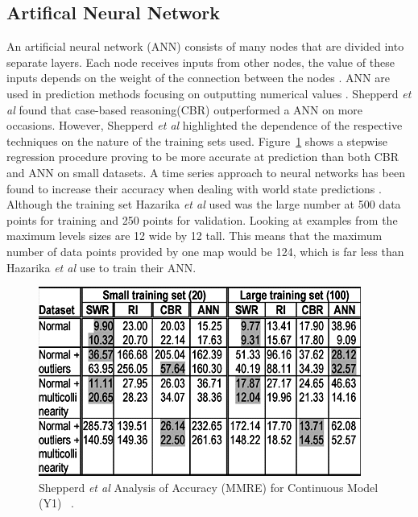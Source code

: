 \documentclass[journal]{IEEEtran}
\begin{document}
\subsection{Artifical Neural Network}
An artificial neural network (ANN) consists of many nodes that are divided into separate layers. Each node receives inputs from other nodes, the value of these inputs depends on the weight of the connection between the nodes \cite{lai2010prediction}. ANN are used in prediction methods focusing on outputting numerical values \cite{lai2010prediction, akdag2009estimation}. Shepperd \textit{et al} \cite{shepperd2001comparing} found that case-based reasoning(CBR) outperformed a ANN on more occasions. However, Shepperd \textit{et al}\cite{shepperd2001comparing} highlighted the dependence of the respective techniques on the nature of the training sets used. Figure~\ref{learningSets} shows a stepwise regression procedure proving to be more accurate at prediction than both CBR and ANN on small datasets.  A time series approach to neural networks has been found to increase their accuracy when dealing with world state predictions \cite{hazarika1998neural}. Although the training set Hazarika \textit{et al} used was the large number at 500 data points for training and 250 points for validation. Looking at examples from \cite{liapis2013sentient, alvarez2018fostering,  baldwin2017mixed} the maximum levels sizes are 12 wide by 12 tall. This means that the maximum number of data points provided by one map would be 124, which is far less than Hazarika \textit{et al} use to train their ANN.

\begin{figure}[h]
	\includegraphics[width=1.0\linewidth]{trainingSets.PNG}
	\caption{Shepperd \textit{et al}  Analysis of Accuracy (MMRE) for Continuous Model (Y1)  ~\cite{shepperd2001comparing}.}
	\label{learningSets}
\end{figure} 
\end{document}
